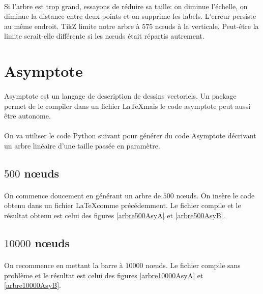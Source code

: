 \paragraph{} Si l'arbre est trop grand, essayons de réduire sa taille: on diminue l'échelle, on diminue la distance entre deux points et on supprime les labels. L'erreur persiste au même endroit. TikZ limite notre arbre à $575$ n\oe uds à la verticale. Peut-être la limite serait-elle différente si les n\oe uds était répartis autrement.

	\section{Asymptote}

\paragraph{}Asymptote est un langage de description de dessins vectoriels. Un package permet de le compiler dans un fichier \LaTeX mais le code asymptote peut aussi être autonome.

\paragraph{}On va utiliser le code Python suivant pour générer du code Asymptote décrivant un arbre linéaire d'une taille passée en paramètre.


		\subsection{$500$ n\oe uds}
		
\paragraph{}On commence doucement en générant un arbre de $500$ n\oe uds. On insère le code obtenu dans un fichier \LaTeX comme précédemment. Le fichier compile et le résultat obtenu est celui des figures \ref{arbre500AsyA} et \ref{arbre500AsyB}.

		\subsection{$10000$ n\oe uds}
\paragraph{}On recommence en mettant la barre à $10000$ n\oe uds. Le fichier compile sans problème et le résultat est celui des figures \ref{arbre10000AsyA} et \ref{arbre10000AsyB}.
	
